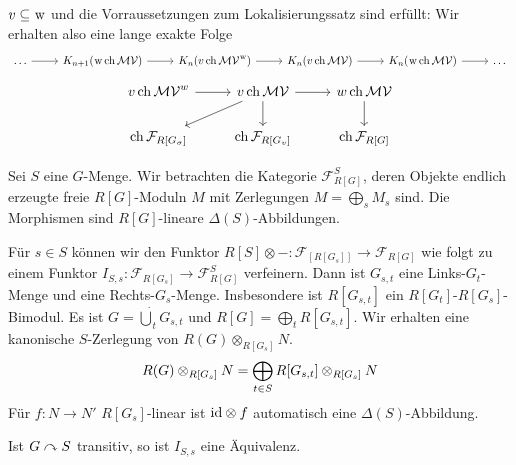 \begin{bemerkung}
	$v \subseteq \mkern1mu\mathrm{w}$ und die Vorraussetzungen zum Lokalisierungssatz sind erfüllt: Wir erhalten also eine lange exakte Folge 
	\[
		\begin{tikzcd}
			\ldots \rar & K_{n+1}(\w \ch \mathcal{MV}) \rar & K_n(v \ch \mathcal{MV}^{\w}) \rar & K_n( v \ch \mathcal{MV}) \rar & K_n(\w \ch \mathcal{MV}) \rar & \ldots 
		\end{tikzcd}
	\]
	\[
		\begin{tikzcd}
			v \ch \mathcal{MV}^w \rar & v \ch \mathcal{MV} \rar  \dar \dlar& w \ch \mathcal{MV} \dar \\
			\ch \mathcal{F}_{R[G_\sigma]} & \ch \mathcal{F}_{R[G_v]} & \ch \mathcal{F}_{R[G]}
		\end{tikzcd}
	\]
\end{bemerkung}

\begin{bemerkung}
	Sei $S$ eine $G$-Menge.
	Wir betrachten die Kategorie $\mathcal{F}_{R[G]}^S$, deren Objekte endlich erzeugte freie $R[G]$-Moduln $M$ mit Zerlegungen $M = \bigoplus_s M_s$ sind.
	Die Morphismen sind $R[G]$-lineare $\Delta(S)$-Abbildungen.
	
	Für $s \in S$ können wir den Funktor $R[S] \otimes{ -} \colon \mathcal{F}_[{R[G_s]}] \to \mathcal{F}_{R[G]}$ wie folgt zu einem Funktor $I_{S,s} \colon \mathcal{F}_{R[G_s]} \to \mathcal{F}_{R[G]}^S$ verfeinern.
	Dann ist $G_{s,t}$ eine Links-$G_t$-Menge und eine Rechts-$G_s$-Menge.
	Insbesondere ist $R[G_{s,t}]$ ein $R[G_t]$-$R[G_s]$-Bimodul.
	Es ist $G = \dot{\bigcup}_t G_{s,t}$ und $R[G] = \bigoplus_t R[G_{s,t}]$.
	Wir erhalten eine kanonische $S$-Zerlegung von $R(G) \otimes_{R[G_s]}  N$.
	\[
		R(G) \otimes_{R[G_s]}  N = \bigoplus_{t \in S} R \benbrace*{G_{s,t}} \otimes_{R[G_s]} N
	\]
	Für $f \colon N \to N'$ $R[G_s]$-linear ist ${\operatorname{id}} \otimes f$ automatisch eine $\Delta(S)$-Abbildung.
\end{bemerkung}

\begin{bemerkung}
	Ist $G \curvearrowright S$ transitiv, so ist $I_{S,s}$ eine Äquivalenz.
\end{bemerkung}

